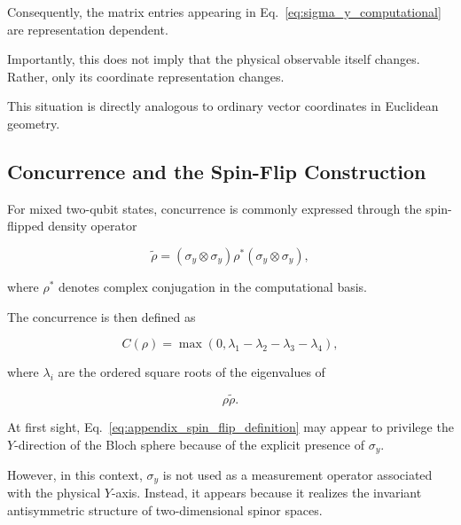 Consequently, the matrix entries appearing in Eq.~\eqref{eq:sigma_y_computational} are representation dependent.

\medskip

Importantly, this does not imply that the physical observable itself changes. Rather, only its coordinate representation changes.

This situation is directly analogous to ordinary vector coordinates in Euclidean geometry.


\subsection*{Concurrence and the Spin-Flip Construction}

For mixed two-qubit states, concurrence is commonly expressed through the spin-flipped density operator

\begin{equation}
\tilde{\rho}
=
(\sigma_y \otimes \sigma_y)
\rho^*
(\sigma_y \otimes \sigma_y),
\label{eq:appendix_spin_flip_definition}
\end{equation}

where \( \rho^* \) denotes complex conjugation in the computational basis.

The concurrence is then defined as

\begin{equation}
C(\rho)
=
\max
\left(
0,
\lambda_1-\lambda_2-\lambda_3-\lambda_4
\right),
\label{eq:appendix_concurrence_definition}
\end{equation}

where \( \lambda_i \) are the ordered square roots of the eigenvalues of

\[
\rho \tilde{\rho}.
\]

\medskip

At first sight, Eq.~\eqref{eq:appendix_spin_flip_definition} may appear to privilege the \( Y \)-direction of the Bloch sphere because of the explicit presence of \( \sigma_y \).

However, in this context, \( \sigma_y \) is not used as a measurement operator associated with the physical \( Y \)-axis. Instead, it appears because it realizes the invariant antisymmetric structure of two-dimensional spinor spaces.


